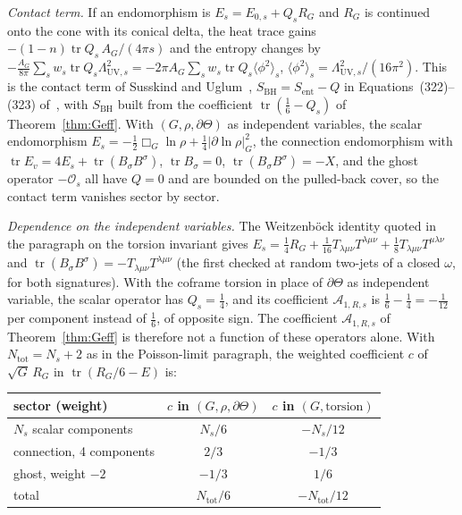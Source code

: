 \emph{Contact term.} If an endomorphism is \(E_s=E_{0,s}+Q_sR_G\) and \(R_G\) is continued onto the cone with its conical delta, the heat trace gains \(-(1-n)\operatorname{tr}Q_s\,A_G/(4\pi s)\) and the entropy changes by \(-\tfrac{A_G}{8\pi}\sum_sw_s\operatorname{tr}Q_s\Lambda_{\mathrm{UV},s}^2=-2\pi A_G\sum_sw_s\operatorname{tr}Q_s\langle\phi^2\rangle_s\), \(\langle\phi^2\rangle_s=\Lambda_{\mathrm{UV},s}^2/(16\pi^2)\). This is the contact term of Susskind and Uglum~\cite{SusskindUglum1994}, \(S_{\mathrm{BH}}=S_{\mathrm{ent}}-Q\) in Equations~(322)--(323) of~\cite{Solodukhin2011}, with \(S_{\mathrm{BH}}\) built from the coefficient \(\operatorname{tr}(\tfrac16-Q_s)\) of Theorem~\ref{thm:Geff}. With \((G,\rho,\partial\Theta)\) as independent variables, the scalar endomorphism \(E_s=-\tfrac12\Box_G\ln\rho+\tfrac14|\partial\ln\rho|_G^2\), the connection endomorphism with \(\operatorname{tr}E_v=4E_s+\operatorname{tr}(B_\sigma B^\sigma)\), \(\operatorname{tr}B_\sigma=0\), \(\operatorname{tr}(B_\sigma B^\sigma)=-X\), and the ghost operator \(-\mathcal O_s\) all have \(Q=0\) and are bounded on the pulled-back cover, so the contact term vanishes sector by sector.

\emph{Dependence on the independent variables.} The Weitzenb\"ock identity quoted in the paragraph on the torsion invariant gives \(E_s=\tfrac14R_G+\tfrac1{16}T_{\lambda\mu\nu}T^{\lambda\mu\nu}+\tfrac18T_{\lambda\mu\nu}T^{\mu\lambda\nu}\) and \(\operatorname{tr}(B_\sigma B^\sigma)=-T_{\lambda\mu\nu}T^{\lambda\mu\nu}\) (the first checked at random two-jets of a closed \(\omega\), for both signatures). With the coframe torsion in place of \(\partial\Theta\) as independent variable, the scalar operator has \(Q_s=\tfrac14\), and its coefficient \(\mathcal A_{1,R,s}\) is \(\tfrac16-\tfrac14=-\tfrac1{12}\) per component instead of \(\tfrac16\), of opposite sign. The coefficient \(\mathcal A_{1,R,s}\) of Theorem~\ref{thm:Geff} is therefore not a function of these operators alone. With \(N_{\mathrm{tot}}=N_s+2\) as in the Poisson-limit paragraph, the weighted coefficient \(c\) of \(\sqrt G\,R_G\) in \(\operatorname{tr}(R_G/6-E)\) is:
\begin{center}
\begin{tabular}{@{}lcc@{}}
\toprule
sector (weight) & \(c\) in \((G,\rho,\partial\Theta)\) & \(c\) in \((G,\text{torsion})\)\\
\midrule
\(N_s\) scalar components & \(N_s/6\) & \(-N_s/12\)\\
connection, 4 components & \(2/3\) & \(-1/3\)\\
ghost, weight \(-2\) & \(-1/3\) & \(1/6\)\\
total & \(N_{\mathrm{tot}}/6\) & \(-N_{\mathrm{tot}}/12\)\\
\bottomrule
\end{tabular}
\end{center}

